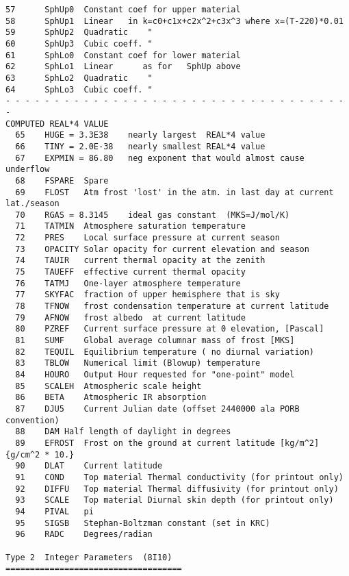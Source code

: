 \begin{verbatim}
57      SphUp0  Constant coef for upper material 
58      SphUp1  Linear   in k=c0+c1x+c2x^2+c3x^3 where x=(T-220)*0.01
59      SphUp2  Quadratic    " 
60      SphUp3  Cubic coeff. "
61      SphLo0  Constant coef for lower material 
62      SphLo1  Linear      as for   SphUp above
63      SphLo2  Quadratic    "
64      SphLo3  Cubic coeff. "
- - - - - - - - - - - - - - - - - - - - - - - - - - - - - - - - - - - -
COMPUTED REAL*4 VALUE	
  65    HUGE = 3.3E38	 nearly largest  REAL*4 value
  66    TINY = 2.0E-38	 nearly smallest REAL*4 value
  67    EXPMIN = 86.80	 neg exponent that would almost cause underflow
  68    FSPARE  Spare
  69    FLOST   Atm frost 'lost' in the atm. in last day at current lat./season
  70    RGAS = 8.3145	 ideal gas constant  (MKS=J/mol/K)
  71    TATMIN  Atmosphere saturation temperature
  72    PRES    Local surface pressure at current season
  73    OPACITY Solar opacity for current elevation and season
  74    TAUIR   current thermal opacity at the zenith
  75    TAUEFF  effective current thermal opacity 
  76    TATMJ   One-layer atmosphere temperature
  77 	SKYFAC	fraction of upper hemisphere that is sky
  78 	TFNOW	frost condensation temperature at current latitude
  79 	AFNOW	frost albedo  at current latitude
  80 	PZREF	Current surface pressure at 0 elevation, [Pascal]
  81	SUMF	Global average columnar mass of frost [MKS]
  82	TEQUIL	Equilibrium temperature ( no diurnal variation)
  83	TBLOW	Numerical limit (Blowup) temperature
  84	HOURO	Output Hour requested for "one-point" model
  85	SCALEH	Atmospheric scale height
  86	BETA	Atmospheric IR absorption
  87	DJU5	Current Julian date (offset 2440000 ala PORB convention)
  88	DAM	Half length of daylight in degrees
  89	EFROST	Frost on the ground at current latitude [kg/m^2] {g/cm^2 * 10.} 
  90	DLAT	Current latitude
  91	COND 	Top material Thermal conductivity (for printout only)
  92	DIFFU	Top material Thermal diffusivity (for printout only)
  93	SCALE	Top material Diurnal skin depth (for printout only)
  94	PIVAL	pi
  95	SIGSB	Stephan-Boltzman constant (set in KRC)
  96	RADC	Degrees/radian

Type 2	Integer Parameters	(8I10) ====================================


\end{verbatim}
